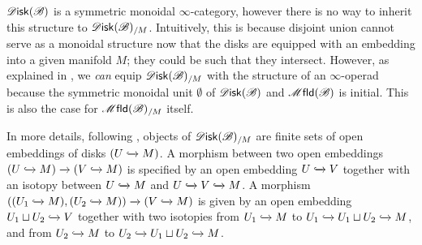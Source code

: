 \documentclass[../text]{subfiles}
\begin{document}
\begin{remark}
    $\disk(\bstr)$ is a symmetric monoidal $\infty$-category, however there is no way to inherit this structure to $\disk(\bstr)_{/M}$. Intuitively, this is because disjoint union cannot serve as a monoidal structure now that the disks are equipped with an embedding into a given manifold $M$; they could be such that they intersect. However, as explained in \cite[not.1.21]{aft_fhstrat}, we \emph{can} equip $\disk(\bstr)_{/M}$ with the structure of an $\infty$-operad because the symmetric monoidal unit $\emptyset$ of $\disk(\bstr)$ and $\mfld(\bstr)$ is initial. This is also the case for $\mfld(\bstr)_{/M}$ itself.

    In more details, following \cite[ex.2.5]{aft_fhstrat}, objects of $\disk(\bstr)_{/M}$ are finite sets of open embeddings of disks $(U \xhookrightarrow{} M)$. A morphism between two open embeddings $(U \xhookrightarrow{} M) \xrightarrow{} (V \xhookrightarrow{} M)$ is specified by an open embedding $U \xhookrightarrow{} V$ together with an isotopy between $U \xhookrightarrow{} M$ and $U \xhookrightarrow{} V \xhookrightarrow{} M$. A morphism $((U_1 \xhookrightarrow{} M), (U_2 \xhookrightarrow{} M)) \xrightarrow{} (V \xhookrightarrow{} M)$ is given by an open embedding $U_1 \sqcup U_2 \xhookrightarrow{} V$ together with two isotopies from $U_1 \xhookrightarrow{} M$ to $U_1 \xhookrightarrow{} U_1 \sqcup U_2 \xhookrightarrow{} M$, and from $U_2 \xhookrightarrow{} M$ to $U_2 \xhookrightarrow{} U_1 \sqcup U_2 \xhookrightarrow{} M$.
\end{remark}
\end{document}
